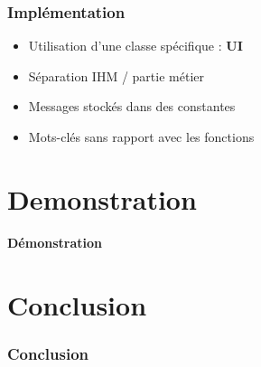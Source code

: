 \documentclass{beamer}
\begin{document}
\begin{frame}
   \frametitle{Implémentation}
  \begin{itemize}
  \item Utilisation d'une classe spécifique : \textbf{UI}
  \item Séparation IHM / partie métier
  \item Messages stockés dans des constantes
  \item Mots-clés sans rapport avec les fonctions
  \end{itemize} 
\end{frame}

\author{PATTYN Maxime}

\section{Demonstration}
\begin{frame}
\begin{center}
  \textbf{Démonstration}
\end{center}
\end{frame}


\section{Conclusion}
\begin{frame}
  \frametitle{Conclusion}
\end{frame}
\end{document}
